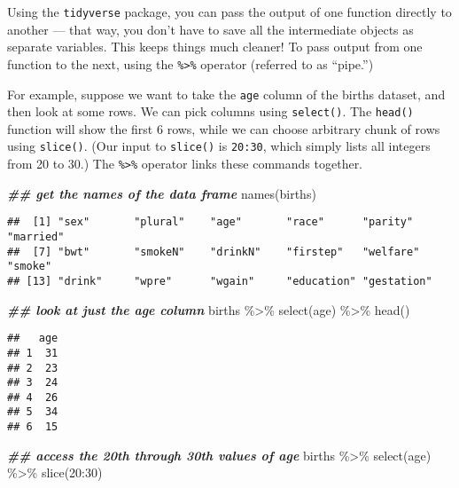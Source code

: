 \documentclass[
]{article}
\newenvironment{Shaded}{\begin{snugshade}}{\end{snugshade}}
\newcommand{\DecValTok}[1]{\textcolor[rgb]{0.00,0.00,0.81}{#1}}
\newcommand{\DocumentationTok}[1]{\textcolor[rgb]{0.56,0.35,0.01}{\textbf{\textit{#1}}}}
\newcommand{\FunctionTok}[1]{\textcolor[rgb]{0.00,0.00,0.00}{#1}}
\newcommand{\NormalTok}[1]{#1}
\newcommand{\SpecialCharTok}[1]{\textcolor[rgb]{0.00,0.00,0.00}{#1}}
\begin{document}
Using the \texttt{tidyverse} package, you can pass the output of one
function directly to another --- that way, you don't have to save all
the intermediate objects as separate variables. This keeps things much
cleaner! To pass output from one function to the next, using the
\texttt{\%\textgreater{}\%} operator (referred to as ``pipe.'')

For example, suppose we want to take the \texttt{age} column of the
births dataset, and then look at some rows. We can pick columns using
\texttt{select()}. The \texttt{head()} function will show the first 6
rows, while we can choose arbitrary chunk of rows using
\texttt{slice()}. (Our input to \texttt{slice()} is \texttt{20:30},
which simply lists all integers from 20 to 30.) The
\texttt{\%\textgreater{}\%} operator links these commands together.

\begin{Shaded}
\begin{Highlighting}[]
\DocumentationTok{\#\# get the names of the data frame}
\FunctionTok{names}\NormalTok{(births)}
\end{Highlighting}
\end{Shaded}

\begin{verbatim}
##  [1] "sex"       "plural"    "age"       "race"      "parity"    "married"  
##  [7] "bwt"       "smokeN"    "drinkN"    "firstep"   "welfare"   "smoke"    
## [13] "drink"     "wpre"      "wgain"     "education" "gestation"
\end{verbatim}

\begin{Shaded}
\begin{Highlighting}[]
\DocumentationTok{\#\# look at just the age column}
\NormalTok{births }\SpecialCharTok{\%\textgreater{}\%} \FunctionTok{select}\NormalTok{(age) }\SpecialCharTok{\%\textgreater{}\%} \FunctionTok{head}\NormalTok{()}
\end{Highlighting}
\end{Shaded}

\begin{verbatim}
##   age
## 1  31
## 2  23
## 3  24
## 4  26
## 5  34
## 6  15
\end{verbatim}

\begin{Shaded}
\begin{Highlighting}[]
\DocumentationTok{\#\# access the 20th through 30th values of age}
\NormalTok{births }\SpecialCharTok{\%\textgreater{}\%} \FunctionTok{select}\NormalTok{(age) }\SpecialCharTok{\%\textgreater{}\%} \FunctionTok{slice}\NormalTok{(}\DecValTok{20}\SpecialCharTok{:}\DecValTok{30}\NormalTok{)}
\end{Highlighting}
\end{Shaded}
\end{document}
